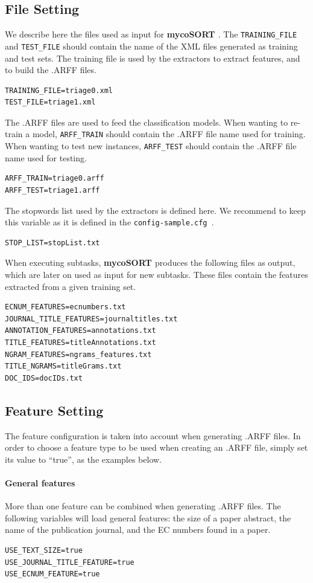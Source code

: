 \documentclass[11pt]{article}
\newcommand{\mycos}{{\bf{mycoSORT{ }}}}
\newcommand{\configsample}{\texttt{config-sample.cfg{ }}}
\begin{document}
\subsection{File Setting}
\label{subsec:fileset}
We describe here the files used as input for \mycos{}.
The \texttt{TRAINING\_FILE} and \texttt{TEST\_FILE} should contain the name of the XML files generated as training and test sets.
The training file is used by the extractors to extract features, and to build the .ARFF files.
\begin{lstlisting}
TRAINING_FILE=triage0.xml
TEST_FILE=triage1.xml
\end{lstlisting}

The .ARFF files are used to feed the classification models. 
When wanting to re-train a model, \texttt{ARFF\_TRAIN} should contain the .ARFF file name used for training.
When wanting to test new instances, \texttt{ARFF\_TEST} should contain the .ARFF file name used for testing.
\begin{lstlisting}
ARFF_TRAIN=triage0.arff
ARFF_TEST=triage1.arff
\end{lstlisting}

The stopwords list used by the extractors is defined here.
We recommend to keep this variable as it is defined in the \configsample.
\begin{lstlisting}
STOP_LIST=stopList.txt
\end{lstlisting}

When executing subtasks, \mycos{} produces the following files as output, 
which are later on used as input for new subtasks.
These files contain the features extracted from a given training set.
\begin{lstlisting}
ECNUM_FEATURES=ecnumbers.txt
JOURNAL_TITLE_FEATURES=journaltitles.txt
ANNOTATION_FEATURES=annotations.txt
TITLE_FEATURES=titleAnnotations.txt
NGRAM_FEATURES=ngrams_features.txt
TITLE_NGRAMS=titleGrams.txt
DOC_IDS=docIDs.txt
\end{lstlisting}

\subsection{Feature Setting}
\label{subsec:featureset}
The feature configuration is taken into account when generating .ARFF files.
In order to choose a feature type to be used when creating an .ARFF file, simply set its value to ``true'', as the examples below. \\
\paragraph{General features}
More than one feature can be combined when generating .ARFF files.
The following variables will load general features: the size of a paper abstract, 
the name of the publication journal, and the EC numbers found in a paper.
\begin{lstlisting} 
USE_TEXT_SIZE=true
USE_JOURNAL_TITLE_FEATURE=true
USE_ECNUM_FEATURE=true
\end{lstlisting}
\end{document}
